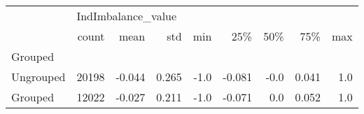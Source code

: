 \begin{tabular}{lrrrrrrrr}
\toprule
{} & \multicolumn{8}{l}{IndImbalance\_value} \\
{} &              count &   mean &    std &  min &    25\% &  50\% &    75\% &  max \\
Grouped   &                    &        &        &      &        &      &        &      \\
\midrule
Ungrouped &              20198 & -0.044 &  0.265 & -1.0 & -0.081 & -0.0 &  0.041 &  1.0 \\
Grouped   &              12022 & -0.027 &  0.211 & -1.0 & -0.071 &  0.0 &  0.052 &  1.0 \\
\bottomrule
\end{tabular}
